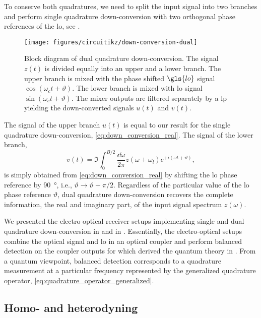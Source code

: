 To conserve both quadratures, we need to split the input signal into two branches and perform single quadrature down-conversion with two orthogonal phase references of the \gls{lo}, see .
\begin{figure}[htb]
	\centering
	\texttt{[image: figures/circuitikz/down-conversion-dual]}
	\caption{Block diagram of dual quadrature down-conversion. The signal $z(t)$ is divided equally into an upper and a lower branch. The upper branch is mixed with the phase shifted $\gls{lo}$ signal $\cos(\omega_ct+\vartheta)$. The lower branch is mixed with \gls{lo} signal $\sin(\omega_ct+\vartheta)$. The mixer outputs are filtered separately by a \gls{lp} yielding the down-converted signals $u(t)$ and $v(t)$.}\label{fig:down_conversion_dual}
\end{figure}
The signal of the upper branch $u(t)$ is equal to our result for the single quadrature down-conversion, \cref{eq:down_conversion_real}.
The signal of the lower branch,
\begin{equation}
	v(t)
	=
	\Im
	\int_0^{B/2}\frac{\dd{\omega}}{2\pi}
	z(\omega+\omega_l)
	e^{+i(\omega t+\vartheta)}
	,
	\label{eq:down_conversion_imag}	
\end{equation}
is simply obtained from \cref{eq:down_conversion_real} by shifting the \gls{lo} phase reference by \SI{90}{\degree}, i.e., $\vartheta\to\vartheta+\pi/2$.
Regardless of the particular value of the \gls{lo} phase reference $\vartheta$, dual quadrature down-conversion recovers the complete information, the real and imaginary part, of the input signal spectrum $z(\omega)$.

We presented the electro-optical receiver setups implementing single and dual quadrature down-conversion in  and  in .
Essentially, the electro-optical setups combine the optical signal and \gls{lo} in an optical coupler and perform balanced detection on the coupler outputs for which derived the quantum theory in .
From a quantum viewpoint, balanced detection corresponds to a quadrature measurement at a particular frequency represented by the generalized quadrature operator, \cref{eq:quadrature_operator_generalized}.

\subsection{Homo- and heterodyning}

